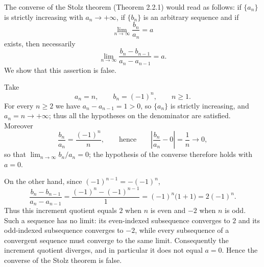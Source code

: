 \documentclass[11pt,a4paper]{article}
\newenvironment{solution}[1]{%
  \par\addvspace{1.7ex}%
  \noindent{\color{solutioncolor}\textbf{#1}}\hspace{0.55em}\ignorespaces}%
  {\par\addvspace{0.9ex}}
\begin{document}
\begin{solution}{Solution 2.2.1}\label{xs:2.2.1}
The converse of the Stolz theorem (Theorem 2.2.1) would read as follows: if $\{a_n\}$ is strictly increasing with $a_n\to+\infty$, if $\{b_n\}$ is an arbitrary sequence and if
\[
\lim_{n\to\infty}\frac{b_n}{a_n}=a
\]
exists, then necessarily
\[
\lim_{n\to\infty}\frac{b_n-b_{n-1}}{a_n-a_{n-1}}=a .
\]
We show that this assertion is false.

Take
\[
a_n=n,\qquad b_n=(-1)^n,\qquad n\ge 1 .
\]
For every $n\ge2$ we have $a_n-a_{n-1}=1>0$, so $\{a_n\}$ is strictly increasing, and $a_n=n\to+\infty$; thus all the hypotheses on the denominator are satisfied. Moreover
\[
\frac{b_n}{a_n}=\frac{(-1)^n}{n},\qquad\text{hence}\qquad
\left|\frac{b_n}{a_n}-0\right|=\frac{1}{n}\longrightarrow 0 ,
\]
so that $\lim_{n\to\infty}b_n/a_n=0$; the hypothesis of the converse therefore holds with $a=0$.

On the other hand, since $(-1)^{n-1}=-(-1)^n$,
\[
\frac{b_n-b_{n-1}}{a_n-a_{n-1}}
=\frac{(-1)^n-(-1)^{n-1}}{1}
=(-1)^n\bigl(1+1\bigr)
=2(-1)^n .
\]
Thus this increment quotient equals $2$ when $n$ is even and $-2$ when $n$ is odd. Such a sequence has no limit: its even-indexed subsequence converges to $2$ and its odd-indexed subsequence converges to $-2$, while every subsequence of a convergent sequence must converge to the same limit. Consequently the increment quotient diverges, and in particular it does not equal $a=0$. Hence the converse of the Stolz theorem is false.
\end{solution}
\end{document}
